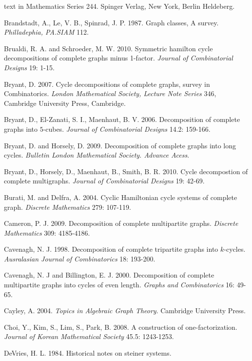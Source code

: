 \documentclass[12pt]{report}
\begin{document}
\begin{newpage}
\begin{description}
{text in Mathematics Series 244}. Spinger Verlag, New York,
Berlin Heldeberg.
 \item Brandstadt, A., Le, V. B., Spinrad, J. P. 1987.  Graph classes, A survey. {\it Philladephia, PA.SIAM} 112.
 \item Brualdi, R. A. and  Schroeder, M. W. 2010. Symmetric hamilton cycle decompositions of complete graphs minus 1-factor. {\it Journal of Combinatorial Designs} 19: 1-15.%
\item Bryant, D. 2007. Cycle decompositions of complete graphs, survey in
Combinatorics.  {\it London Mathematical Society, Lecture Note Series } 346,
Cambridge University Press, Cambridge.
\item Bryant, D., El-Zanati, S. I., Maenhaut, B. V. 2006. Decomposition of
complete graphs into $5$-cubes. {\it Journal of Combinatorial Designs} 14.2:
159-166.
 \item Bryant, D. and Horsely, D. 2009.  Decomposition of complete graphs into long cycles. {\it Bulletin London Mathematical Society. Advance
 Acess}.
\item Bryant, D., Horsely, D., Maenhaut, B., Smith, B. R. 2010. Cycle
decompostion of complete multigraphs. {\it Journal of Combinatorial Designs}
19: 42-69.
\item Burati, M. and Delfra, A. 2004. Cyclic Hamiltonian cycle systems of
complete graph. {\it Discrete Mathematics } 279: 107-119.
\item Cameron, P. J. 2009. Decomposition of complete multipartite graphs.
{\it Discrete Mathematics} 309: 4185-4186.
 \item Cavenagh, N. J. 1998. Decomposition of complete tripartite graphs into $k$-cycles. {\it Ausralasian Journal of Combinatorics} 18: 193-200.
\item Cavenagh, N. J and Billington, E. J. 2000. Decomposition of complete
multipartite graphs into cycles of even length. {\it Graphs and
Combinatorics} 16:  49-65.
\item Cayley, A. 2004. {\it Topics in Algebraic Graph Theory}. Cambridge University Press.
\item Choi, Y., Kim, S., Lim, S., Park, B. 2008. A construction of
one-factorization. {\it Journal of Korean Mathematical Society} 45.5: 1243-1253.
\item DeVries, H. L. 1984. Historical notes on steiner systems. {\it
}
\end{description}
\end{newpage}
\end{document}
